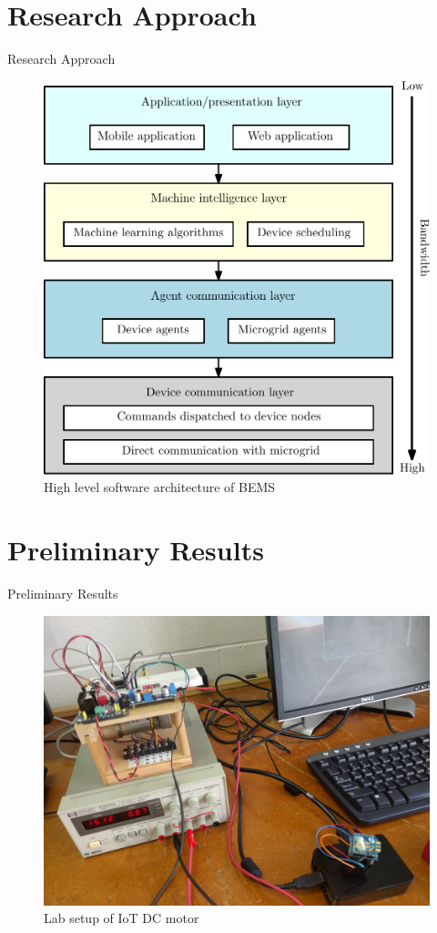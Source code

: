 \documentclass{beamer}
\begin{document}
\section{Research Approach}
\begin{frame}{Research Approach}
\begin{figure}
\includegraphics[scale=0.35]{figs/ipe/BEMS-SoftwareArchitecture}
\caption{High level software architecture of BEMS}
\end{figure}
\end{frame}

\section{Preliminary Results}
\begin{frame}{Preliminary Results}
\begin{figure}
\includegraphics[scale=0.05]{figs/motorSetup.jpg}
\caption{Lab setup of IoT DC motor}
\end{figure}
\end{frame}
\end{document}
